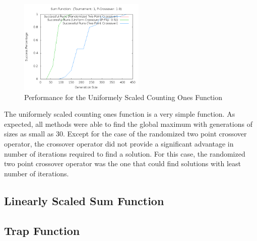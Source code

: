 \documentclass[10pt]{article}
\begin{document}
\begin{figure}[h!]
    \includegraphics[height=170px]{img/SumFunctionCrossoverGens.png}
    \caption{Performance for the Uniformely Scaled Counting Ones Function}
\end{figure}

The uniformely scaled counting ones function is a very simple function. As expected, all methods were able to find the global maximum with generations of sizes as small as 30. Except for the case of the randomized two point crossover operator, the crossover operator did not provide a significant advantage in number of iterations required to find a solution. For this case, the randomized two point crossover operator was the one that could find solutions with least number of iterations.

\subsection{Linearly Scaled Sum Function}



\subsection{Trap Function}
\end{document}
